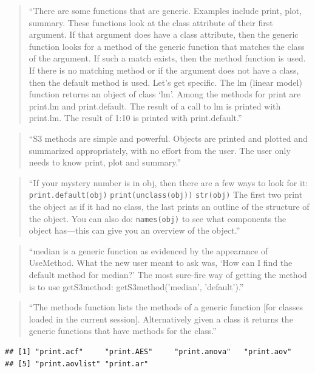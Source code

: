 \documentclass[]{tufte-book}
\begin{document}
\begin{quote}
``There are some functions that are generic. Examples include print, plot,
summary. These functions look at the class attribute of their first argument. If
that argument does have a class attribute, then the generic function looks for a
method of the generic function that matches the class of the argument. If such a
match exists, then the method function is used. If there is no matching method
or if the argument does not have a class, then the default method is used.
Let's get specific. The lm (linear model) function returns an object of class
`lm'. Among the methods for print are print.lm and print.default. The
result of a call to lm is printed with print.lm. The result of 1:10 is printed
with print.default.''
\citep{burns2011r}
\end{quote}

\begin{quote}
``S3 methods are simple and powerful. Objects are printed and plotted and
summarized appropriately, with no effort from the user. The user only needs to
know print, plot and summary.'' \citep{burns2011r}
\end{quote}

\begin{quote}
``If your mystery number is in obj, then there are a few
ways to look for it:
\texttt{print.default(obj)}
\texttt{print(unclass(obj))}
\texttt{str(obj)}
The first two print the object as if it had no class, the last prints an outline of
the structure of the object. You can also do:
\texttt{names(obj)}
to see what components the object has---this can give you an overview of the
object.'' \citep{burns2011r}
\end{quote}

\begin{quote}
``median is a generic
function as evidenced by the appearance of UseMethod. What the new user
meant to ask was, `How can I find the default method for median?'
The most sure-fire way of getting the method is to use getS3method:
getS3method('median', 'default').'' \citep{burns2011r}
\end{quote}

\begin{quote}
``The methods function lists the methods of a generic function {[}for classes loaded in the current session{]}. Alternatively
given a class it returns the generic functions that have methods for the class.'' \citep{burns2011r}
\end{quote}

\begin{verbatim}
## [1] "print.acf"     "print.AES"     "print.anova"   "print.aov"    
## [5] "print.aovlist" "print.ar"
\end{verbatim}
\end{document}
